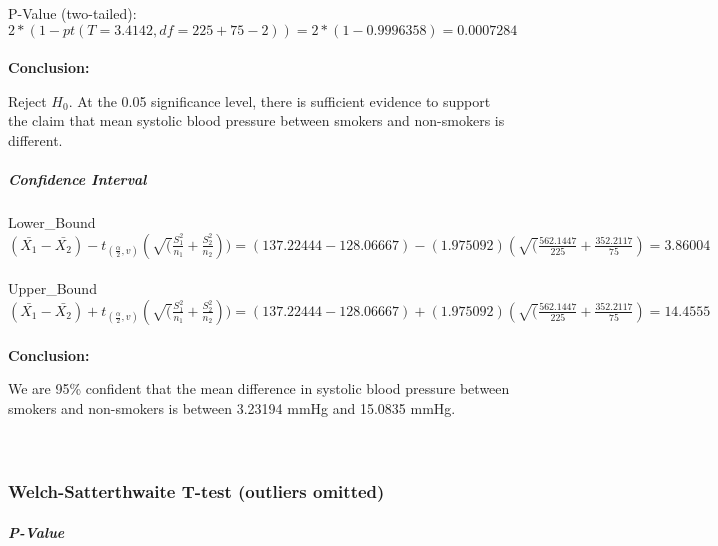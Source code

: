 \documentclass[
]{article}
\begin{document}
P-Value (two-tailed):\\
\(2*(1-pt(T = 3.4142,df = 225+75-2)) = 2*(1-0.9996358) = 0.0007284\)\\
~\\

\textbf{Conclusion:}

Reject \(H_{0}\). At the 0.05 significance level, there is sufficient
evidence to support the claim that mean systolic blood pressure between
smokers and non-smokers is different.

\hypertarget{confidence-interval-2}{%
\subparagraph{\texorpdfstring{\textbf{Confidence
Interval}}{Confidence Interval}}\label{confidence-interval-2}}

\hfill\break
Lower\_Bound\\
\((\bar{X_{1}}-\bar{X_{2}}) - t_{(\frac{\alpha}{2},v)}(\sqrt(\frac{S^2_{1}}{n_{1}}+\frac{S^2_{2}}{n_{2}})) = (137.22444 - 128.06667) - (1.975092)(\sqrt(\frac{562.1447}{225}+\frac{352.2117}{75}) = 3.86004\)\\
~\\
Upper\_Bound\\
\((\bar{X_{1}}-\bar{X_{2}}) + t_{(\frac{\alpha}{2},v)}(\sqrt(\frac{S^2_{1}}{n_{1}}+\frac{S^2_{2}}{n_{2}})) = (137.22444 - 128.06667) + (1.975092)(\sqrt(\frac{562.1447}{225}+\frac{352.2117}{75}) = 14.4555\)\\
~\\

\textbf{Conclusion:}

We are 95\% confident that the mean difference in systolic blood
pressure between smokers and non-smokers is between 3.23194 mmHg and
15.0835 mmHg.\\
~\\
~\\

\hypertarget{welch-satterthwaite-t-test-outliers-omitted}{%
\subsubsection{Welch-Satterthwaite T-test (outliers
omitted)}\label{welch-satterthwaite-t-test-outliers-omitted}}

\hypertarget{p-value-3}{%
\subparagraph{\texorpdfstring{\textbf{P-Value}}{P-Value}}\label{p-value-3}}

\hfill\break
\end{document}
